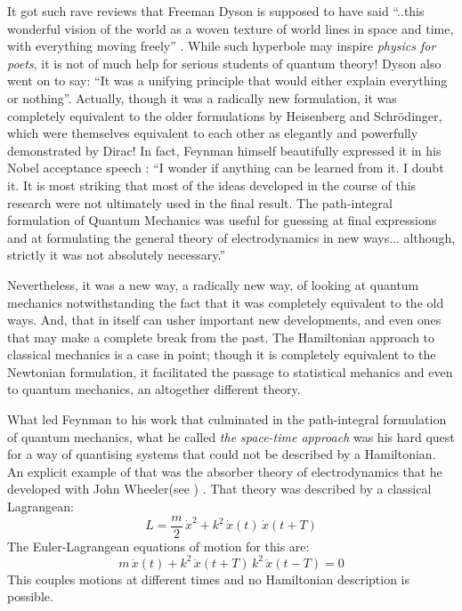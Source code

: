 \documentclass[12pt]{article}
\newcommand{\be}{\begin{equation}}
\newcommand{\ee}{\end{equation}}
\begin{document}
It got such rave reviews that Freeman Dyson is supposed to have said ``..this wonderful vision of the world as a woven texture of world lines in space and time, with everything moving freely'' \cite{gleick}. While such hyperbole may inspire {\it physics for poets}, it is not of much
help for serious students of quantum theory! Dyson also went on to say: ``It was a unifying principle that would either explain everything or nothing''. Actually, though it was a radically new formulation, it was completely equivalent to the older formulations by Heisenberg and Schr\"odinger, which were themselves equivalent to each other as elegantly and powerfully demonstrated by Dirac! In fact, Feynman himself beautifully
expressed it in his Nobel acceptance speech \cite{nobel}: ``I wonder if anything can be learned from it. I doubt it. It is most striking that 
most of the ideas developed in the course of this research were not ultimately used in the final result. The path-integral formulation of 
Quantum Mechanics was useful for guessing at final expressions and at formulating the general theory of electrodynamics in new ways...
although, strictly it was not absolutely necessary.''

Nevertheless, it was a new way, a radically new way, of looking at quantum mechanics notwithstanding the fact that it was completely equivalent
to the old ways. And, that in itself can usher important new developments, and even ones that may make a complete break from the past. The
Hamiltonian approach to classical mechanics is a case in point; though it is completely equivalent to the Newtonian formulation, it facilitated
the passage to statistical mehanics and even to quantum mechanics, an altogether different theory.

What led Feynman to his work that culminated in the path-integral formulation of quantum mechanics, what he called {\it the space-time
approach}\cite{feynpaper} was his hard quest for a way of quantising systems that could not be described by a Hamiltonian. An explicit
example of that was the absorber theory of electrodynamics that he developed with John Wheeler(see \cite{thesis}) . That theory was
described by a classical Lagrangean: 
\be
\label{eq:absorberL}
L = \frac{m}{2}\,{\dot x}^2 + k^2\,{\dot x}(t)\,{\dot x}(t + T)
\ee
The Euler-Lagrangean equations of motion for this are:
\be
\label{eq:absorberEOM}
m\,{\ddot x}(t) + k^2\,{\ddot x}(t + T)\,k^2\,{\ddot x}(t - T) = 0
\ee
This couples motions at different times and no Hamiltonian description is possible.
\end{document}
